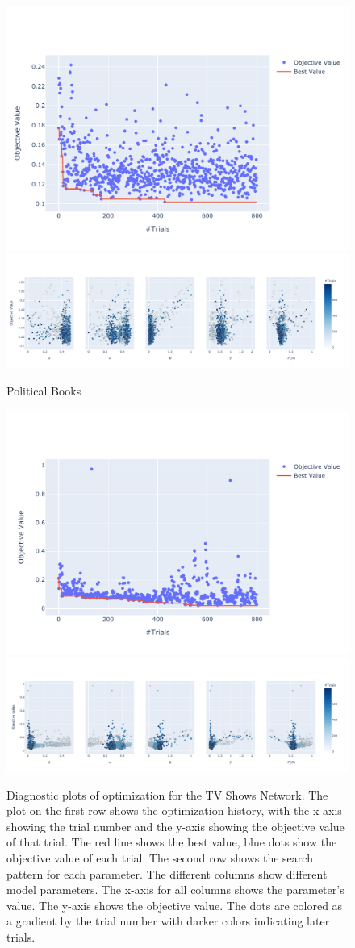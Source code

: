 \documentclass[11pt]{article}
\begin{document}
\begin{figure}[H]
    \centering
    \includegraphics[width=.7\linewidth]{../plots/overall/Optimization_History_polbooks.pdf}
    \includegraphics[width=.7\linewidth]{../plots/overall/Plot_Slice_polbooks.pdf}
  \caption{Political Books}
  \label{appendix:optimization_polbooks}
\end{figure}

\begin{figure}[H]
    \centering
    \includegraphics[width=.7\linewidth]{../plots/overall/Optimization_History_tvshows.pdf}
    \includegraphics[width=.7\linewidth]{../plots/overall/Plot_Slice_tvshows.pdf}
  \caption{Diagnostic plots of optimization for the TV Shows Network. The plot on the first row shows the optimization history, with the x-axis showing the trial number and the y-axis showing the objective value of that trial. The red line shows the best value, blue dots show the objective value of each trial. The second row shows the search pattern for each parameter. The different columns show different model parameters. The x-axis for all columns shows the parameter's value. The y-axis shows the objective value. The dots are colored as a gradient by the trial number with darker colors indicating later trials.}
  \label{appendix:optimization_tvshows}
\end{figure}
\end{document}
